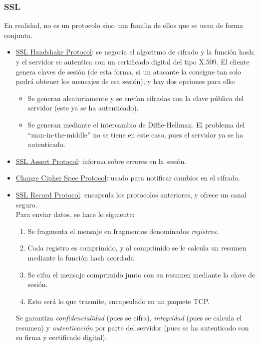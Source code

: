 \subsubsection{\acrfull{SSL}}
En realidad, no es un protocolo sino una familia de ellos que se usan de forma conjunta.
\begin{itemize}
    \item \ul{\acrshort{SSL} Handshake Protocol}: se negocia el algoritmo de cifrado y la función hash; y el servidor se autentica con un certificado digital del tipo {X.509}. El cliente genera claves de sesión (de esta forma, si un atacante la consigue tan solo podrá obtener los mensajes de esa sesión), y hay dos opciones para ello:
    \begin{itemize}
        \item Se generan aleatoriamente y se envían cifradas con la clave pública del servidor (este ya se ha autenticado).
        \item Se generan mediante el intercambio de Diffie-Hellman. El problema del ``man-in-the-middle'' no se tiene en este caso, pues el servidor ya se ha autenticado.
    \end{itemize}

    \item \ul{\acrshort{SSL} Assert Protocol}: informa sobre errores en la sesión.
    \item \ul{Change Cipher Spec Protocol}: usado para notificar cambios en el cifrado.

    \item \ul{\acrshort{SSL} Record Protocol}: encapsula los protocolos anteriores, y ofrece un canal seguro.\\
    
    Para enviar datos, se hace lo siguiente:
    \begin{enumerate}
        \item Se fragmenta el mensaje en fragmentos denominados \emph{registros}.
        \item Cada registro es comprimido, y al comprimido se le calcula un resumen mediante la función hash acordada.
        \item Se cifra el mensaje comprimido junto con su resumen mediante la clave de sesión.
        \item Esto será lo que trasmite, encapsulado en un paquete \acrshort{TCP}.
    \end{enumerate}
    
    Se garantiza \emph{confidencialidad} (pues se cifra), \emph{integridad} (pues se calcula el resumen) y \emph{autenticación} por parte del servidor (pues se ha autenticado con su firma y certificado digital).
\end{itemize}



